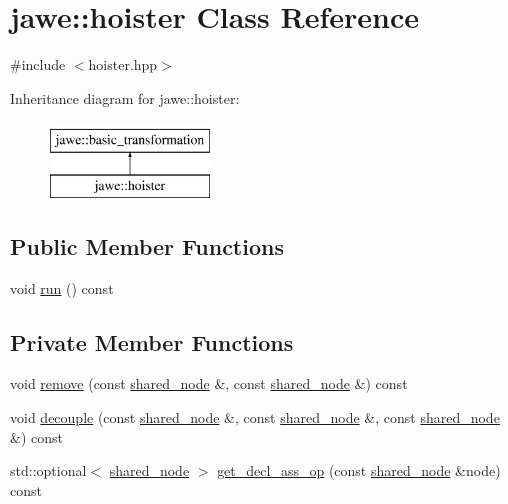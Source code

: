 \hypertarget{classjawe_1_1hoister}{}\section{jawe\+:\+:hoister Class Reference}
\label{classjawe_1_1hoister}


{\ttfamily \#include $<$hoister.\+hpp$>$}

Inheritance diagram for jawe\+:\+:hoister\+:\begin{figure}[H]
\begin{center}
\leavevmode
\includegraphics[height=2.000000cm]{classjawe_1_1hoister}
\end{center}
\end{figure}
\subsection*{Public Member Functions}
\begin{DoxyCompactItemize}
\item 
void \hyperlink{classjawe_1_1hoister_ad1dc4fda5106d44c88a4b63c7343fac1}{run} () const
\end{DoxyCompactItemize}
\subsection*{Private Member Functions}
\begin{DoxyCompactItemize}
\item 
void \hyperlink{classjawe_1_1hoister_a0ded030bc81ae44432c35d5cdc457f6b}{remove} (const \hyperlink{namespacejawe_a3f307481d921b6cbb50cc8511fc2b544}{shared\+\_\+node} \&, const \hyperlink{namespacejawe_a3f307481d921b6cbb50cc8511fc2b544}{shared\+\_\+node} \&) const
\item 
void \hyperlink{classjawe_1_1hoister_a873d522bfb787607d5d07cbe01ae4344}{decouple} (const \hyperlink{namespacejawe_a3f307481d921b6cbb50cc8511fc2b544}{shared\+\_\+node} \&, const \hyperlink{namespacejawe_a3f307481d921b6cbb50cc8511fc2b544}{shared\+\_\+node} \&, const \hyperlink{namespacejawe_a3f307481d921b6cbb50cc8511fc2b544}{shared\+\_\+node} \&) const
\item 
std\+::optional$<$ \hyperlink{namespacejawe_a3f307481d921b6cbb50cc8511fc2b544}{shared\+\_\+node} $>$ \hyperlink{classjawe_1_1hoister_ade816feb01b1c0dc5bd56a5f78cb3947}{get\+\_\+decl\+\_\+ass\+\_\+op} (const \hyperlink{namespacejawe_a3f307481d921b6cbb50cc8511fc2b544}{shared\+\_\+node} \&node) const
\end{DoxyCompactItemize}


